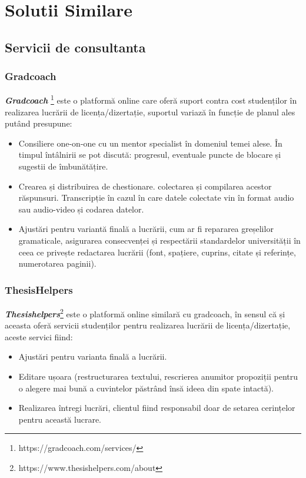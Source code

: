\documentclass[12pt,a4paper,hidelinks]{report}
\theoremstyle{definition}
\theoremstyle{remark}
\begin{document}
\chapter{Solutii Similare}
\section{Servicii de consultanta}
\subsection{Gradcoach}
\textbf{\textit{Gradcoach}} \footnote[1]{https://gradcoach.com/services/} este o platformă online care oferă suport contra cost studenților în realizarea lucrării de licența/dizertație, suportul variază în funcție de planul ales putând presupune:
\begin{itemize}
    \item Consiliere one-on-one cu un mentor specialist în domeniul temei alese. În timpul întâlnirii se pot discută: progresul, eventuale puncte de blocare și sugestii de îmbunătățire.
    \item Crearea și distribuirea de chestionare. colectarea și compilarea acestor răspunsuri. Transcripție în cazul în care datele colectate vin în format audio sau audio-video și codarea datelor.
    \item Ajustări pentru variantă finală a lucrării, cum ar fi repararea greșelilor gramaticale, asigurarea consecvenței și respectării standardelor universității în ceea ce privește redactarea lucrării (font, spațiere, cuprins, citate și referințe, numerotarea paginii).
\end{itemize}




\subsection{ThesisHelpers}
\textbf{\textit{Thesishelpers}}\footnote[2]{https://www.thesishelpers.com/about} este o platformă online similară cu gradcoach, în sensul că și aceasta oferă servicii studenților pentru realizarea lucrării de licența/dizertație, aceste servici fiind: 
\begin{itemize}
    \item Ajustări pentru varianta finală a lucrării.
    \item Editare ușoara (restructurarea textului, rescrierea anumitor propoziții pentru o alegere mai bună a cuvintelor păstrând însă ideea din spate intactă).
    \item Realizarea întregi lucrări, clientul fiind responsabil doar de setarea cerințelor pentru această lucrare.
\end{itemize} 
\end{document}
